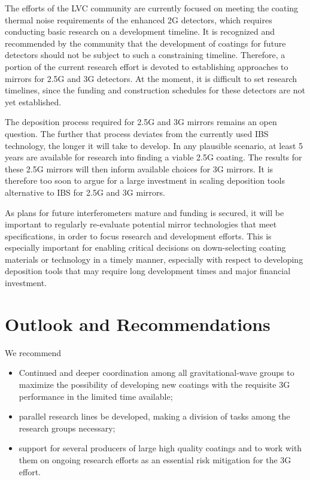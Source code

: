 The efforts of the \ac{LVC} community are currently focused on meeting the coating thermal noise requirements of the enhanced \ac{2G} detectors, which requires conducting basic research on a development timeline. It is recognized and recommended by the community that the development of coatings for future detectors should not be subject to such a constraining timeline. Therefore, a portion of the current research effort is devoted to establishing approaches to mirrors for \ac{2.5G} and \ac{3G} detectors. At the moment, it is difficult to set research timelines, since the funding and construction schedules for these detectors are not yet established.

The deposition process required for \ac{2.5G} and \ac{3G} mirrors remains an open question. The further that process deviates from the currently used \ac{IBS} technology, the longer it will take to develop. In any plausible scenario, at least 5 years are available for research into finding a viable \ac{2.5G} coating. The results for these \ac{2.5G} mirrors will then inform available choices for \ac{3G} mirrors. It is therefore too soon to argue for a large investment in scaling deposition tools alternative to \ac{IBS} for \ac{2.5G} and \ac{3G} mirrors.

As plans for future interferometers mature and funding is secured, it will be important to regularly re-evaluate potential mirror technologies that meet specifications, in order to focus research and development efforts. This is especially important for enabling critical decisions on down-selecting coating materials or technology in a timely manner, especially with respect to developing deposition tools that may require long development times and major financial investment.



\section{Outlook and Recommendations}
\label{coatings_Recomm}
We recommend
\begin{itemize}
\item Continued and deeper coordination among all gravitational-wave groups to maximize the possibility of developing new coatings with the requisite \ac{3G} performance in the limited time available;
\item  parallel research lines be developed, making a division of tasks among the research groups necessary;
\item support for several producers of large high quality coatings and to work with them on ongoing research efforts as an essential risk mitigation for the \ac{3G} effort.
\end{itemize}


